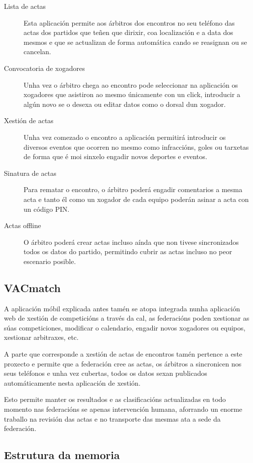   \begin{description}
    \item [Lista de actas]
    Esta aplicación permite aos árbitros dos encontros no seu teléfono 
das actas dos partidos que teñen que dirixir, coa localización e a data dos 
mesmos e que se actualizan de forma automática cando se reasignan ou se 
cancelan.

    \item [Convocatoria de xogadores]
    Unha vez o árbitro chega ao encontro pode seleccionar na aplicación os 
xogadores que asistiron ao mesmo únicamente con un click, introducir a algún 
novo se o desexa ou editar datos como o dorsal dun xogador.

    \item [Xestión de actas]
    Unha vez comezado o encontro a aplicación permitirá introducir os diversos 
eventos que ocorren no mesmo como infraccións, goles ou tarxetas de forma que é 
moi sinxelo engadir novos deportes e eventos.
    
    \item [Sinatura de actas]
    Para rematar o encontro, o árbitro poderá engadir comentarios a mesma acta 
e tanto él como un xogador de cada equipo poderán asinar a acta con un código 
PIN.

    \item [Actas offline]
    O árbitro poderá crear actas incluso aínda que non tivese sincronizados 
todos os datos do partido, permitindo cubrir as actas incluso no peor escenario 
posible.

  \end{description} 

    \subsection{VACmatch}
    A aplicación móbil explicada antes tamén se atopa integrada nunha 
aplicación web de xestión de competicións a través da cal, as federacións poden 
xestionar as súas competiciones, modificar o calendario, engadir novos 
xogadores ou equipos, xestionar arbitraxes, etc.

    A parte que corresponde a xestión de actas de encontros tamén pertence a 
este proxecto e permite que a federación cree as actas, os árbitros a 
sincronicen nos seus teléfonos e unha vez cubertas, todos os datos sexan 
publicados automáticamente nesta aplicación de xestión.

    Esto permite manter os resultados e as clasificacións actualizadas en todo 
momento nas federacións se apenas intervención humana, aforrando un enorme 
traballo na revisión das actas e no transporte das mesmas ata a sede da 
federación.


  \subsection{Estrutura da memoria}
  
  
  
